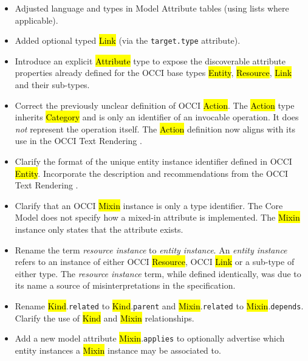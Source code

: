 \documentclass[10pt,a4paper]{article}
\begin{document}
\begin{itemize}
\item Adjusted language and types in Model Attribute tables (using lists where applicable).

\item Added optional typed \hl{Link} (via the {\tt target.type} attribute).

\item Introduce an explicit \hl{Attribute} type to expose the discoverable
  attribute properties already defined for the OCCI base types \hl{Entity},
  \hl{Resource}, \hl{Link} and their sub-types.

\item Correct the previously unclear definition of OCCI \hl{Action}. The
  \hl{Action} type inherits \hl{Category} and is only an identifier of
  an invocable operation. It does {\em not} represent the operation itself.
  The \hl{Action} definition now aligns with its use in the OCCI Text Rendering
  \cite{occi:text}.

\item Clarify the format of the unique entity instance identifier defined in
  OCCI \hl{Entity}. Incorporate the description and recommendations from the
  OCCI Text Rendering \cite{occi:text}.

\item Clarify that an OCCI \hl{Mixin} instance is only a type identifier. The
  Core Model does not specify how a mixed-in attribute is implemented. The
  \hl{Mixin} instance only states that the attribute exists.

\item Rename the term {\em resource instance} to {\em entity instance}.
  An {\em entity instance} refers to an instance of either OCCI \hl{Resource},
  OCCI \hl{Link} or a sub-type of either type. The {\em resource instance}
  term, while defined identically, was due to its name a source of
  misinterpretations in the specification.

\item Rename \hl{Kind}.{\tt related} to \hl{Kind}.{\tt parent} and
  \hl{Mixin}.{\tt related} to \hl{Mixin}.{\tt depends}. Clarify the use
  of \hl{Kind} and \hl{Mixin} relationships.

\item Add a new model attribute \hl{Mixin}.{\tt applies} to optionally
  advertise which entity instances a \hl{Mixin} instance may be associated to.
\end{itemize}
\end{document}
